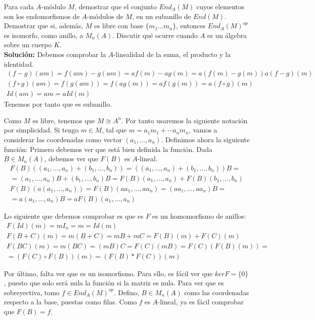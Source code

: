\begin{ejercicio}
    Para cada $A$-módulo $M$, demostrar que el conjunto $End_A(M)$ cuyos elementos son los endomorfismos de $A$-módulos de $M$, en un subanillo de $End(M)$. Demostrar que si, además, $M$ es libre con base $\{m_1 \ldots m_n\}$, entonces $End_A(M)^{op}$ es isomorfo, como anillo, a $M_n(A)$. Discutir qué ocurre cuando $A$ es un álgebra sobre un cuerpo $K$. \\
    
    \noindent
    \textbf{Solución:}
    Debemos comprobar la $A$-linealidad de la suma, el producto y la identidad. 
    \begin{gather*}
        (f-g)(am) = f(am) - g(am) = af(m) - ag(m) = a(f(m)-g(m))a(f-g)(m) \\
        (f\circ g)(am) = f(g(am)) = f(ag(m)) = af(g(m)) = a(f\circ g)(m) \\ 
        Id(am)=am = a Id(m)
    \end{gather*}
    Tenemos por tanto que es subanillo. 

    Como $M$ es libre, tenemos que $M\cong A^n$. Por tanto usaremos la siguiente notación por simplicidad. Si tengo $m \in M$, tal que $m = a_1m_1 + \cdots a_nm_n $, vamos a considerar las coordenadas como vector $(a_1, \ldots, a_n)$.
    Definimos ahora la siguiente función:
    Primero debemos ver que está bien definida la función. Dada $B \in M_n(A)$, debemos ver que $F(B)$ es $A$-lineal. 
    \begin{gather*}
        F(B)((a_1,\ldots,a_n) + (b_1,\ldots,b_n)) = ((a_1,\ldots,a_n) + (b_1,\ldots,b_n))B =\\
        = (a_1,\ldots,a_n)B + (b_1,\ldots,b_n)B = F(B)(a_1,\ldots,a_n) + F(B)(b_1,\ldots,b_n) \\
        F(B)(a(a_1,\ldots, a_n)) = F(B)(aa_1,\ldots,aa_n) = (aa_1,\ldots,aa_n)B =\\
        =a(a_1,\ldots, a_n)B = aF(B)(a_1,\ldots, a_n)
    \end{gather*}

    Lo siguiente que debemos comprobar es que es $F$ es un homomorfismo de anillos:
    \begin{gather*}
        F(Id) (m) = m I_n = m = Id(m) \\
        F(B + C)(m)= m (B+C) = mB + mC = F(B)(m) + F(C)(m) \\
        F(BC)(m) = m (BC) = (mB)C = F(C)(mB) = F(C)(F(B)(m)) =\\
        =(F(C) \circ F(B))(m) = (F(B)\ast F(C))(m)
    \end{gather*}

    Por último, falta ver que es un isomorfismo. Para ello, es fácil ver que $ker F = \{0\}$, puesto que solo será nula la función si la matriz es nula. Para ver que es sobreyectiva, tomo $f \in End_A(M)^{op}$. Defino, $B \in M_n(A)$ como las coordenadas respecto a la base, puestas como filas. Como $f$ es $A$-lineal, ya es fácil comprobar que $F(B) = f$.

\end{ejercicio}

